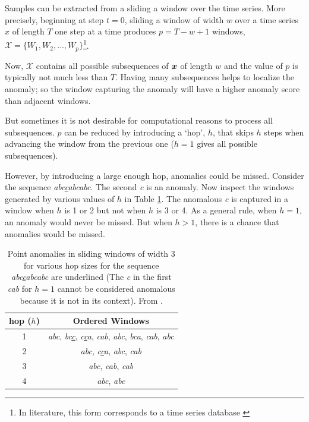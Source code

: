 Samples can be extracted from a sliding a window over the time series. More precisely, beginning at step $t=0$, sliding a window of width $w$ over a time series $x$ of length $T$ one step at a time produces $p=T-w+1$ windows, $\mathcal{X}=\{W_1,W_2,\ldots,W_p\}$\footnote{In literature, this form corresponds to a time series database \cite{Gupta2013}}.

Now, $\mathcal{X}$ contains all possible subsequences of $\boldsymbol{x}$ of length $w$ and the value of $p$ is typically not much less than $T$. Having many subsequences helps to localize the anomaly; so the window capturing the anomaly will have a higher anomaly score than adjacent windows.

But sometimes it is not desirable for computational reasons to process all subsequences. $p$ can be reduced by introducing a `hop', $h$, that skips $h$ steps when advancing the window from the previous one ($h=1$ gives all possible subsequences).

However, by introducing a large enough hop, anomalies could be missed. Consider the sequence \emph{abc\underline{c}abcabc}. The second \emph{c} is an anomaly. Now inspect the windows generated by various values of $h$ in Table \ref{tbl:hop}. The anomalous \emph{c} is captured in a window when $h$ is 1 or 2 but not when $h$ is 3 or 4. As a general rule, when $h=1$, an anomaly would never be missed. But when $h>1$, there is a chance that anomalies would be missed.

\begin{table}[h]
  \centering
  \caption[Point anomalies in sliding windows of various hop sizes]{Point anomalies in sliding windows of width 3 for various hop sizes for the sequence \emph{abc\underline{c}abcabc} are underlined (The \emph{c} in the first \emph{cab} for $h=1$ cannot be considered anomalous because it is not in its context). From \cite{Cheboli2010}.}
  \begin{tabular}{|c|c|}
    \hline
    hop ($h$) & Ordered Windows \\
    \hline
    \hline
    1 & \emph{abc},
        \emph{bc\underline{c}}, 
        \emph{c\underline{c}a}, 
        \emph{cab},
        \emph{abc}, 
        \emph{bca},
        \emph{cab},
        \emph{abc} \\
    \hline
    2 & \emph{abc},
        \emph{c\underline{c}a},
        \emph{abc},
        \emph{cab} \\
    \hline
    3 & \emph{abc}, 
        \emph{cab},
        \emph{cab} \\
    \hline
    4 & \emph{abc}, 
        \emph{abc} \\
    \hline
  \end{tabular}
  \label{tbl:hop}
\end{table}

